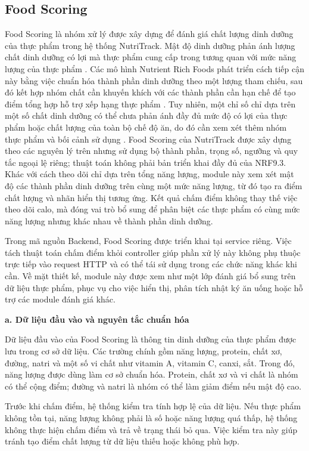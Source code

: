 \documentclass[12pt, a4paper]{report}
\begin{document}
\subsection{Food Scoring}Food Scoring là nhóm xử lý được xây dựng để đánh giá chất lượng dinh dưỡng của thực phẩm trong hệ thống NutriTrack. Mật độ dinh dưỡng phản ánh lượng chất dinh dưỡng có lợi mà thực phẩm cung cấp trong tương quan với mức năng lượng của thực phẩm \cite{drewnowski2005}. Các mô hình Nutrient Rich Foods phát triển cách tiếp cận này bằng việc chuẩn hóa thành phần dinh dưỡng theo một lượng tham chiếu, sau đó kết hợp nhóm chất cần khuyến khích với các thành phần cần hạn chế để tạo điểm tổng hợp hỗ trợ xếp hạng thực phẩm \cite{drewnowski2009}. Tuy nhiên, một chỉ số chỉ dựa trên một số chất dinh dưỡng có thể chưa phản ánh đầy đủ mức độ có lợi của thực phẩm hoặc chất lượng của toàn bộ chế độ ăn, do đó cần xem xét thêm nhóm thực phẩm và bối cảnh sử dụng \cite{drewnowski2019}. Food Scoring của NutriTrack được xây dựng theo các nguyên lý trên nhưng sử dụng bộ thành phần, trọng số, ngưỡng và quy tắc ngoại lệ riêng; thuật toán không phải bản triển khai đầy đủ của NRF9.3.
Khác với cách theo dõi chỉ dựa trên tổng năng lượng, module này xem xét mật độ các thành phần dinh dưỡng trên cùng một mức năng lượng, từ đó tạo ra điểm chất lượng và nhãn hiển thị tương ứng. Kết quả chấm điểm không thay thế việc theo dõi calo, mà đóng vai trò bổ sung để phân biệt các thực phẩm có cùng mức năng lượng nhưng khác nhau về thành phần dinh dưỡng.

Trong mã nguồn Backend, Food Scoring được triển khai tại service riêng. Việc tách thuật toán chấm điểm khỏi controller giúp phần xử lý này không phụ thuộc trực tiếp vào request HTTP và có thể tái sử dụng trong các chức năng khác khi cần. Về mặt thiết kế, module này được xem như một lớp đánh giá bổ sung trên dữ liệu thực phẩm, phục vụ cho việc hiển thị, phân tích nhật ký ăn uống hoặc hỗ trợ các module đánh giá khác.

\textbf{a. Dữ liệu đầu vào và nguyên tắc chuẩn hóa}

Dữ liệu đầu vào của Food Scoring là thông tin dinh dưỡng của thực phẩm được lưu trong cơ sở dữ liệu. Các trường chính gồm năng lượng, protein, chất xơ, đường, natri và một số vi chất như vitamin A, vitamin C, canxi, sắt. Trong đó, năng lượng được dùng làm cơ sở chuẩn hóa. Protein, chất xơ và vi chất là nhóm có thể cộng điểm; đường và natri là nhóm có thể làm giảm điểm nếu mật độ cao.

Trước khi chấm điểm, hệ thống kiểm tra tính hợp lệ của dữ liệu. Nếu thực phẩm không tồn tại, năng lượng không phải là số hoặc năng lượng quá thấp, hệ thống không thực hiện chấm điểm và trả về trạng thái bỏ qua. Việc kiểm tra này giúp tránh tạo điểm chất lượng từ dữ liệu thiếu hoặc không phù hợp.
\end{document}
